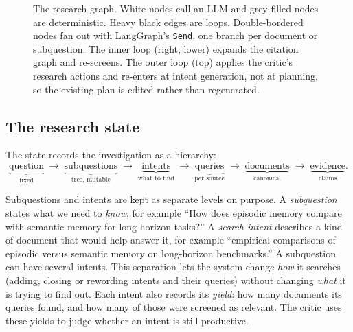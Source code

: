 \documentclass{article}
\begin{document}
\begin{figure}[t]
{}
\caption{The research graph. White nodes call an LLM and grey-filled nodes are
deterministic. Heavy black edges are loops. Double-bordered nodes fan out with LangGraph's \texttt{Send},
one branch per document or subquestion. The inner loop (right, lower)
expands the citation graph and re-screens. The outer loop (top) applies the
critic's research actions and re-enters at intent generation, not at
planning, so the existing plan is edited rather than regenerated.}
\label{fig:graph}
\end{figure}

\subsection{The research state}
\label{sec:state}

The state records the investigation as a hierarchy:
\[
\underbrace{\text{question}}_{\text{fixed}} \;\to\;
\underbrace{\text{subquestions}}_{\text{tree, mutable}} \;\to\;
\underbrace{\text{intents}}_{\text{what to find}} \;\to\;
\underbrace{\text{queries}}_{\text{per source}} \;\to\;
\underbrace{\text{documents}}_{\text{canonical}} \;\to\;
\underbrace{\text{evidence}}_{\text{claims}} .
\]

Subquestions and intents are kept as separate levels on purpose. A \emph{subquestion} states what we need to \emph{know}, for example ``How does episodic memory compare with semantic memory for long-horizon tasks?'' A \emph{search intent} describes a kind of document that would help answer it, for example ``empirical comparisons of episodic versus semantic memory on long-horizon benchmarks.'' A subquestion can have several intents. This separation lets the system change \emph{how} it searches (adding, closing or rewording intents and their queries) without changing \emph{what} it is trying to find out. Each intent also records its \emph{yield}: how many documents its queries found, and how many of those were screened as relevant. The critic uses these yields to judge whether an intent is still productive.
\end{document}
